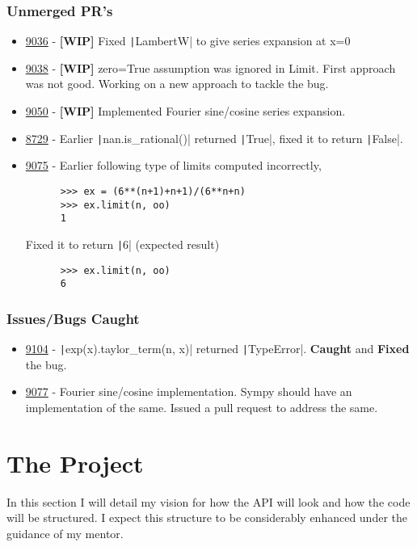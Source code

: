 \documentclass[a4paper,12pt]{article}
\newcommand{\pyline}[1]{\texttt|#1|}
\newcommand{\pull}[1]{\href{https://github.com/sympy/sympy/pull/#1}{#1}}
\newcommand{\issue}[1]{\href{https://github.com/sympy/sympy/issue/#1}{#1}}
\begin{document}
\subsubsection*{Unmerged PR's}
\begin{itemize}
  \item \pull{9036} - \textbf{[WIP]} Fixed \pyline{LambertW} to give series expansion at x=0
  \item \pull{9038} - \textbf{[WIP]} zero=True assumption was ignored in Limit. First approach was not good. Working on a new approach to tackle the bug.
  \item \pull{9050} - \textbf{[WIP]} Implemented Fourier sine/cosine series expansion.
  \item \pull{8729} - Earlier \pyline{nan.is_rational()} returned \pyline{True}, fixed it to return \pyline{False}.
  \item \pull{9075} - Earlier following type of limits computed incorrectly,
    \begin{verbatim}
      >>> ex = (6**(n+1)+n+1)/(6**n+n)
      >>> ex.limit(n, oo)
      1
    \end{verbatim}
    Fixed it to return \pyline{6} (expected result)
    \begin{verbatim}
      >>> ex.limit(n, oo)
      6
    \end{verbatim}
\end{itemize}

\subsubsection*{Issues/Bugs Caught}
\begin{itemize}
  \item \issue{9104} - \pyline{exp(x).taylor_term(n, x)} returned \pyline{TypeError}. \textbf{Caught} and \textbf{Fixed} the bug.
  \item \issue{9077} - Fourier sine/cosine implementation. Sympy should have an implementation of the same. Issued a pull request to address the same.
\end{itemize}

\section{The Project}

In this section I will detail my vision for how the API will look and
how the code will be structured. I expect this structure to be
considerably enhanced under the guidance of my mentor.
\end{document}
